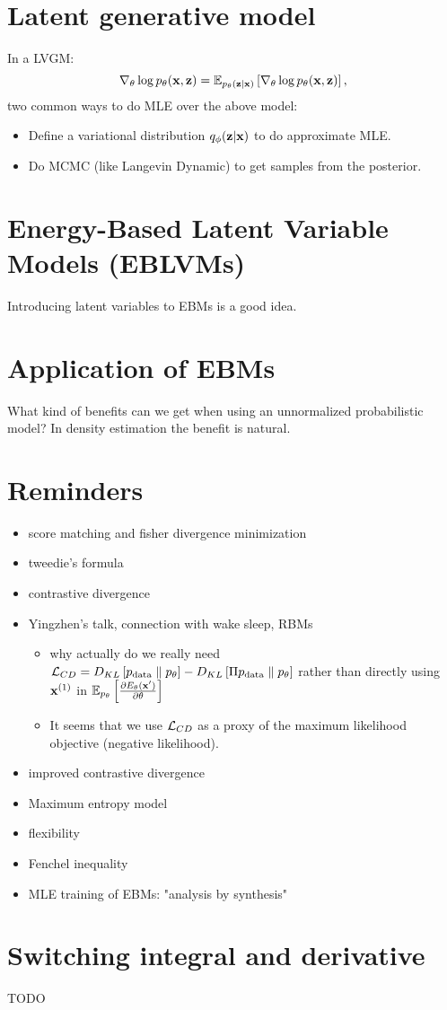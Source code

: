 \documentclass{article}
\begin{document}
\section{Latent generative model}
\citep{xiao2022adaptive}
In a LVGM:
$$
\nabla_\theta \log p_\theta({\mathbf{x}}, {\mathbf{z}}) = \mathbb{E}_{p_\theta({\mathbf{z}} | {\mathbf{x}})}\left[ \nabla_\theta \log p_\theta({\mathbf{x}}, {\mathbf{z}}) \right],
$$
two common ways to do MLE over the above model:
\begin{itemize}
    \item Define a variational distribution $q_\phi({\mathbf{z}} | {\mathbf{x}})$ to do approximate MLE.
    \item Do MCMC (like Langevin Dynamic) to get samples from the posterior.
\end{itemize}




\section{Energy-Based Latent Variable Models (EBLVMs)}
Introducing latent variables to EBMs is a good idea.

\section{Application of EBMs}
What kind of benefits can we get when using an unnormalized probabilistic model? In density estimation the benefit is natural.
\section{Reminders}
\begin{itemize}
    \item score matching and fisher divergence minimization
    \item tweedie's formula
    \item contrastive divergence
    \item Yingzhen's talk, connection with wake sleep, RBMs
    \begin{itemize}
        \item why actually do we really need $\mathcal{L}_{CD} = D_{KL}\left[ p_{\rm{data}} \parallel p_\theta \right] - D_{KL}\left[ \Pi p_{\rm{data}} \parallel p_\theta \right] $ rather than directly using $ {\mathbf{x}}^{(1)} $ in $ \mathbb{E}_{p_\theta}\left[ \frac{\partial E_\theta({\mathbf{x}}^{\prime})}{\partial \theta} \right] $ 
        \item It seems that we use $ \mathcal{L}_{CD} $ as a proxy of the maximum likelihood objective (negative likelihood).
    \end{itemize}
    \item improved contrastive divergence
\end{itemize}
\begin{itemize}
    \item Maximum entropy model
    \item flexibility
    \item Fenchel inequality
    \item MLE training of EBMs: "analysis by synthesis"
\end{itemize}

 


\appendix
\section{Switching integral and derivative}\label{Asec.switchintgrad}
TODO
\end{document}
